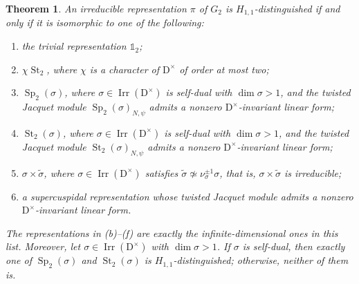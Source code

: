 \documentclass[11pt]{amsart}
\numberwithin{equation}{section}
\theoremstyle{plain}
\newtheorem{theorem}{Theorem}[section]
\theoremstyle{definition}
\theoremstyle{remark}
\newcommand{\one}{\mathds{1}}
\DeclareMathOperator{\Irr}{Irr}
\DeclareMathOperator{\St}{St}
\DeclareMathOperator{\Sp}{Sp}
\begin{document}
\begin{theorem}\label{thm:rank2-classification}
	An irreducible representation $\pi$ of $G_2$ is $H_{1,1}$-distinguished if and only if it is isomorphic to one of the following:
	\begin{enumerate}[label=\textup{(\alph*)}]
		\item the trivial representation $\one_2$;
		\item $\chi\St_2$, where $\chi$ is a character of $\mathrm{D}^\times$ of order at most two;
		\item $\Sp_2(\sigma)$, where $\sigma\in\Irr(\mathrm{D}^\times)$ is self-dual with $\dim\sigma>1$, and the twisted Jacquet module $\Sp_2(\sigma)_{N,\psi}$ admits a nonzero $\mathrm{D}^\times$-invariant linear form;
		\item $\St_2(\sigma)$, where $\sigma\in\Irr(\mathrm{D}^\times)$ is self-dual with $\dim\sigma>1$, and the twisted Jacquet module $\St_2(\sigma)_{N,\psi}$ admits a nonzero $\mathrm{D}^\times$-invariant linear form;
		\item $\sigma\times\widetilde\sigma$, where $\sigma\in\Irr(\mathrm{D}^\times)$ satisfies $\widetilde\sigma\not\simeq\nu_\sigma^{\pm1}\sigma$, that is, $\sigma\times\widetilde\sigma$ is irreducible;
		\item a supercuspidal representation whose twisted Jacquet module admits a nonzero $\mathrm{D}^\times$-invariant linear form.
	\end{enumerate}
	The representations in \textup{(b)--(f)} are exactly the infinite-dimensional ones in this list. Moreover, let $\sigma\in\Irr(\mathrm{D}^\times)$ with $\dim\sigma>1$. If $\sigma$ is self-dual, then exactly one of $\Sp_2(\sigma)$ and $\St_2(\sigma)$ is $H_{1,1}$-distinguished; otherwise, neither of them is.
\end{theorem}
\end{document}
